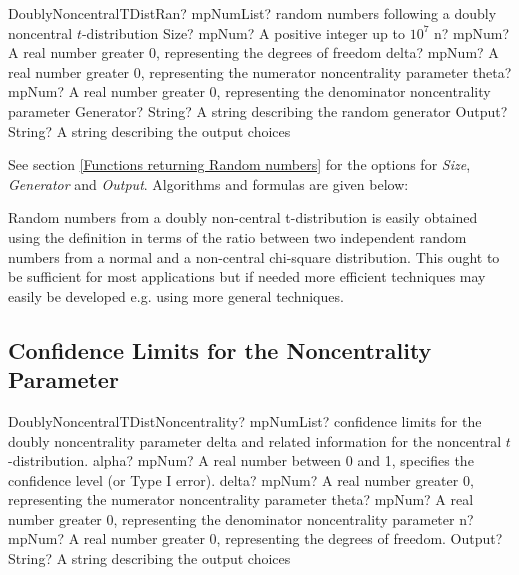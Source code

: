 \begin{mpFunctionsExtract}
	\mpFunctionSixNotImplemented
	{DoublyNoncentralTDistRan? mpNumList? random numbers following a doubly noncentral $t$-distribution}
	{Size? mpNum? A positive integer up to $10^7$}
	{n? mpNum? A real number greater 0, representing the degrees of freedom}
	{delta? mpNum? A real number greater 0, representing the numerator noncentrality parameter}
	{theta? mpNum? A real number greater 0, representing the denominator noncentrality parameter}
	{Generator? String? A string describing the random generator}
	{Output? String? A string describing the output choices}
\end{mpFunctionsExtract}


\vspace{0.3cm}
See section \ref{Functions returning Random numbers} for the options for  {\itshape\sffamily Size},  {\itshape\sffamily Generator} and {\itshape\sffamily Output}. Algorithms and formulas are given below:

\vspace{0.3cm}
Random numbers from a doubly non-central t-distribution is easily obtained using the definition in terms of the ratio between two independent random numbers from a normal and a non-central chi-square distribution. This ought to be sufficient for most applications but if needed more efficient techniques may easily be developed e.g. using more general techniques.




\subsection{Confidence Limits for the Noncentrality Parameter}
\label{DoublyNoncentraltNoncentrality}

\begin{mpFunctionsExtract}
	\mpFunctionFiveNotImplemented
	{DoublyNoncentralTDistNoncentrality? mpNumList? confidence limits for the doubly noncentrality parameter delta and related information for the noncentral $t$-distribution.}
	{alpha? mpNum? A real number between 0 and 1, specifies the confidence level (or Type I error).}
	{delta? mpNum? A real number greater 0, representing the numerator noncentrality parameter}
	{theta? mpNum? A real number greater 0, representing the denominator noncentrality parameter}
	{n? mpNum? A real number greater 0, representing the degrees of freedom.}
	{Output? String? A string describing the output choices}
\end{mpFunctionsExtract}


